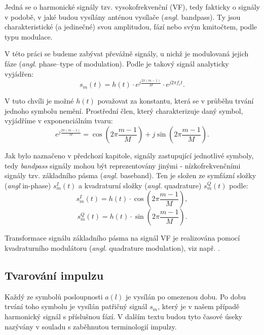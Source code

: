 Jedná se o harmonické signály tzv. vysokofrekvenční (VF), tedy fakticky o signály v podobě, v jaké budou vysílány anténou vysílače (\textsl{angl.} bandpass). Ty jsou charakteristické (a jedinečné) svou amplitudou, fází nebo svým kmitočtem, podle typu modulace. 

V této práci se budeme zabývat převážně signály, u nichž je modulovaná jejich fáze (\textsl{angl.}  phase--type of modulation). Podle \cite{proakis2007} je takový signál analyticky vyjádřen:
\begin{equation}
 s_m(t) = h(t)\cdot e^{j\frac{2\pi (m-1)}{M}} \cdot e^{j2\pi f_c t}.  \label{eq:waveformsBP}
\end{equation}

V tuto chvíli je možné $h(t)$ považovat za konstantu, která se v průběhu trvání jednoho symbolu nemění. Prostřední člen, který charakterizuje daný symbol, vyjádříme v exponenciálním tvaru:
\begin{equation}
 e^{j\frac{2\pi (m-1)}{M}} = \cos(2\pi \frac{m-1}{M}) + j\sin(2\pi \frac{m-1}{M}). \label{eq:waveformsBB00}
\end{equation}

\marginpar{\textcolor{txt_blue}{Baseband signál}}
Jak bylo naznačeno v předchozí kapitole, signály zastupující jednotlivé symboly, tedy \textsl{bandpass} signály mohou být reprezentovány jinými - nízkofrekvenčními signály tzv. základního pásma (\textsl{angl.} baseband). Ten je složen ze symfázní složky (\textsl{angl} in-phase) $s_m^I(t)$ a kvadraturní složky (\textsl{angl.} quadrature) $s_m^Q(t)$ podle:
\begin{equation}
 s_m^I(t) = h(t) \cdot \cos(2\pi \frac{m-1}{M}), \label{eq:waveformsI}
\end{equation}
\begin{equation}
 s_m^Q(t) = h(t) \cdot \sin(2\pi \frac{m-1}{M}). \label{eq:waveformsQ}
\end{equation}

Transformace signálu základního pásma na signál VF je realizována pomocí kvadraturního modulátoru (\textsl{angl.} quadrature modulation), viz např. \cite{proakis2007}. 


\subsection{Tvarování impulzu}
Každý ze symbolů posloupnosti $a(l)$ je vysílán po omezenou dobu. Po dobu trvání toho symbolu je vysílán patřičný signál $s_m$, který je v našem případě harmonický signál s příslušnou fází. V dalším textu budou tyto časové úseky nazývány v souladu s zaběhnutou terminologií impulzy. 


